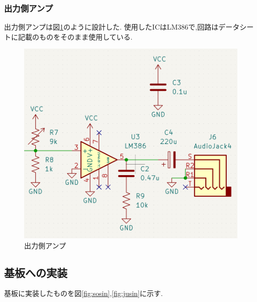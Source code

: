 \documentclass[a4paper,10pt]{article}
\begin{document}
\begin{multicols}{2}[\raggedcolumns]
\newpage
\subsubsection{出力側アンプ}
出力側アンプは図\ref{fig:out_amp}のように設計した.
使用したICはLM386で,回路はデータシートに記載のものをそのまま使用している.

\begin{figure}[H]
    \centering
    \includegraphics[width=\linewidth]{figure/out_amp.png} 
    \caption{出力側アンプ} 
    \label{fig:out_amp}
\end{figure}

\subsection{基板への実装}
基板に実装したものを図\ref{fig:sosin},\ref{fig:jusin}に示す.


\end{multicols}
\end{document}
